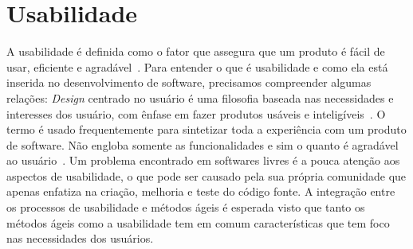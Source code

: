 \section{Usabilidade}
\label{sec:usabilidade}

A usabilidade é definida como o fator que assegura que um produto é fácil de usar, eficiente e agradável~\cite{preece2007}.
%
Para entender o que é usabilidade e como ela está inserida no desenvolvimento de software, precisamos compreender algumas relações: 
%
\emph{Design} centrado no usuário é uma filosofia baseada nas necessidades e interesses dos usuário, com ênfase em fazer produtos usáveis e inteligíveis~\cite{norman2006design}.
%
O termo é usado frequentemente para sintetizar toda a experiência com um produto de software. Não engloba somente as funcionalidades e sim o quanto é agradável ao usuário~\cite{travis2013}.
%
Um problema encontrado em softwares livres é a pouca atenção aos aspectos de usabilidade, o que pode ser causado pela sua própria comunidade que apenas enfatiza na criação, melhoria e teste do código fonte.  
%
A integração entre os processos de usabilidade e métodos ágeis é esperada visto que tanto os métodos ágeis como a usabilidade tem em comum características que tem foco nas necessidades dos usuários.
